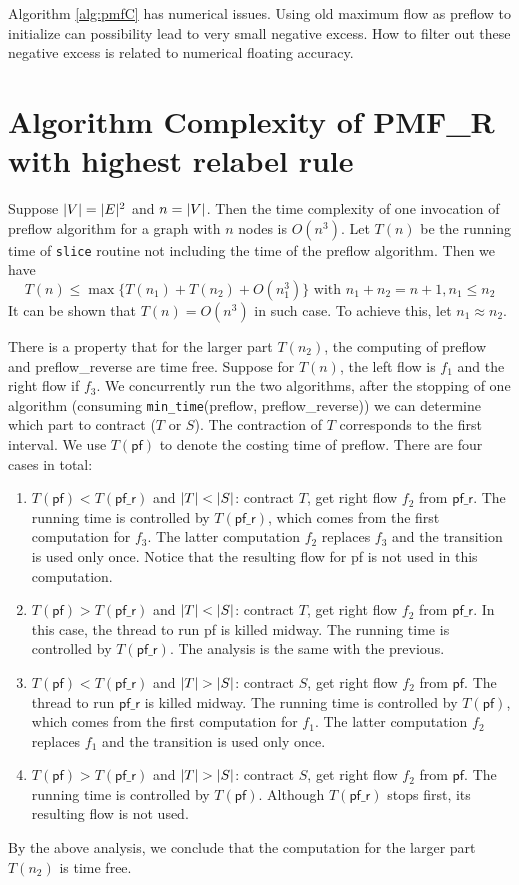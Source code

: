 \documentclass{article}
\begin{document}
Algorithm \ref{alg:pmfC} has numerical issues. Using old maximum flow as preflow to initialize can possibility lead to very small negative excess. How to filter out these negative excess is related to numerical floating accuracy.

\section{Algorithm Complexity of PMF\_R with highest relabel rule}
Suppose $\lvert V\rvert=\lvert E\rvert^2$ and $n=\lvert V\rvert$. Then the time complexity of one invocation of preflow algorithm for a graph with $n$ nodes is $O(n^3)$. Let $T(n)$ be the running time of \texttt{slice} routine not including the time of the preflow algorithm.
Then we have
\begin{equation}
T(n) \leq \max\{T(n_1) + T(n_2) + O(n_1^3)\} \textrm{ with } n_1 + n_2 = n+1, n_1 \leq n_2
\end{equation}
It can be shown that $T(n) = O(n^3)$ in such case. To achieve this,  let $n_1 \approx n_2$.

There is a property that for the larger part $T(n_2)$, the computing of preflow and preflow\_reverse are time free. Suppose for $T(n)$, the left flow is $f_1$ and the right flow if $f_3$. We concurrently run the two algorithms, after the stopping of one algorithm (consuming \texttt{min\_time}(preflow, preflow\_reverse))
we can determine which part to contract ($T$ or $S$). The contraction of $T$ corresponds to the first interval.
We use $T(\textsf{pf})$ to denote the costing time of preflow. There are four cases in total:
\begin{enumerate}
\item $T(\textsf{pf}) < T(\textsf{pf\_r})$ and $\lvert T\rvert < \lvert S\rvert$: contract $T$, get right flow $f_2$ from $\textsf{pf\_r}$. The running time is controlled by  $T(\textsf{pf\_r})$, which comes from the first computation for $f_3$. The latter computation $f_2$ replaces $f_3$ and the transition is used only once. Notice that the resulting flow for \textsf{pf} is not used in this computation.
\item $T(\textsf{pf}) > T(\textsf{pf\_r})$ and $\lvert T\rvert < \lvert S\rvert$: contract $T$, get right flow $f_2$ from $\textsf{pf\_r}$.  In this case, the thread to run \textsf{pf} is killed midway. The running time is controlled by 
$T(\textsf{pf\_r})$. The analysis is the same with the previous.
\item $T(\textsf{pf}) < T(\textsf{pf\_r})$ and $\lvert T\rvert > \lvert S\rvert$: contract $S$, get right flow $f_2$ from $\textsf{pf}$. The thread to run $\textsf{pf\_r}$ is killed midway. The running time is controlled by 
$T(\textsf{pf})$, which comes from the first computation for $f_1$. The latter computation $f_2$ replaces $f_1$ and the transition is used only once. 
\item $T(\textsf{pf}) > T(\textsf{pf\_r})$ and $\lvert T\rvert > \lvert S\rvert$: contract $S$, get right flow $f_2$ from $\textsf{pf}$. The running time is controlled by $T(\textsf{pf})$. Although $T(\textsf{pf\_r})$ stops first, its resulting flow is not used.
\end{enumerate}
By the above analysis, we conclude that the computation for the larger part $T(n_2)$ is time free.
\end{document}
